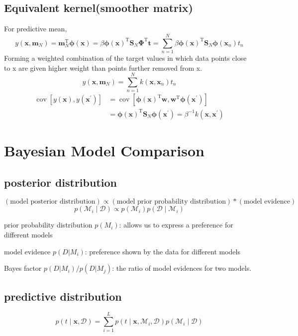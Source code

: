 \documentclass{article}
\begin{document}
\subsection{Equivalent kernel(smoother matrix)}
For predictive mean,
$$
y\left(\mathbf{x}, \mathbf{m}_{N}\right)=\mathbf{m}_{N}^{\mathrm{T}} \boldsymbol{\phi}(\mathbf{x})=\beta \boldsymbol{\phi}(\mathbf{x})^{\mathrm{T}} \mathbf{S}_{N} \boldsymbol{\Phi}^{\mathrm{T}} \mathbf{t}=\sum_{n=1}^{N} \beta \boldsymbol{\phi}(\mathbf{x})^{\mathrm{T}} \mathbf{S}_{N} \boldsymbol{\phi}\left(\mathbf{x}_{n}\right) t_{n}
$$
Forming a weighted combination of the target values in which data points close to x are given higher weight than points further removed from x.
$$
y\left(\mathbf{x}, \mathbf{m}_{N}\right)=\sum_{n=1}^{N} k\left(\mathbf{x}, \mathbf{x}_{n}\right) t_{n}
$$
$$
\begin{aligned}
\operatorname{cov}\left[y(\mathbf{x}), y\left(\mathbf{x}^{\prime}\right)\right] &=\operatorname{cov}\left[\boldsymbol{\phi}(\mathbf{x})^{\mathrm{T}} \mathbf{w}, \mathbf{w}^{\mathrm{T}} \boldsymbol{\phi}\left(\mathbf{x}^{\prime}\right)\right] \\
&=\boldsymbol{\phi}(\mathbf{x})^{\mathrm{T}} \mathbf{S}_{N} \boldsymbol{\phi}\left(\mathbf{x}^{\prime}\right)=\beta^{-1} k\left(\mathbf{x}, \mathbf{x}^{\prime}\right)
\end{aligned}
$$

\section{Bayesian Model Comparison}
\subsection{posterior distribution}
$$
(\text{model posterior distribution}) \propto (\text{model prior probability distribution}) * (\text{model evidence})
$$
$$
p\left(\mathcal{M}_{i} \mid \mathcal{D}\right) \propto p\left(\mathcal{M}_{i}\right) p\left(\mathcal{D} \mid \mathcal{M}_{i}\right)
$$

prior probability distribution $p(M_i)$: allows us to express a preference for different models

model evidence $p(D|M_i)$: preference shown by the data for different models

Bayes factor $p(D | M_i)/p(D | M_j)$: the ratio of model evidences for two models.

\subsection{predictive distribution}
$$
p(t \mid \mathbf{x}, \mathcal{D})=\sum_{i=1}^{L} p\left(t \mid \mathbf{x}, \mathcal{M}_{i}, \mathcal{D}\right) p\left(\mathcal{M}_{i} \mid \mathcal{D}\right)
$$
\end{document}
